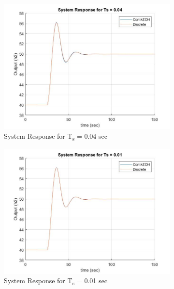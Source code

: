 \documentclass[a4paper,12pt,oneside,onecolumn]{article} %
\begin{document}
\begin{figure}[H]
\begin{subfigure}{0.4\textwidth}
  \includegraphics[width = \textwidth]{ex_8_5}
\caption{System Response for T\textsubscript{s} = 0.04 sec}
\end{subfigure}
\vspace{1em}
\begin{subfigure}{0.4\textwidth}
  \includegraphics[width = \textwidth]{ex_8_6}
\caption{System Response for T\textsubscript{s} = 0.01 sec}
\end{subfigure}
\vspace{1em}
\begin{subfigure}{0.4\textwidth}

\end{subfigure}
\end{figure}
\end{document}
